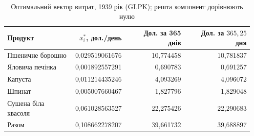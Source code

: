 \begin{table}[htbp]
\centering\small
\caption{Оптимальний вектор витрат, 1939 рік (GLPK); решта компонент дорівнюють нулю}
\label{tab:glpk-solution-1939}
\begin{tabular}{lrrr}
\toprule
Продукт & $x_i^*$, дол./день & Дол. за 365 днів & Дол. за $365{,}25$ дня \\
\midrule
Пшеничне борошно & 0{,}029519061676 & 10{,}774458 & 10{,}781837 \\
Яловича печінка & 0{,}001892557291 & 0{,}690783 & 0{,}691257 \\
Капуста & 0{,}011214435246 & 4{,}093269 & 4{,}096072 \\
Шпинат & 0{,}005007660467 & 1{,}827796 & 1{,}829048 \\
Сушена біла квасоля & 0{,}061028563527 & 22{,}275426 & 22{,}290683 \\
\midrule
Разом & 0{,}108662278207 & 39{,}661732 & 39{,}688897 \\
\bottomrule
\end{tabular}
\end{table}
